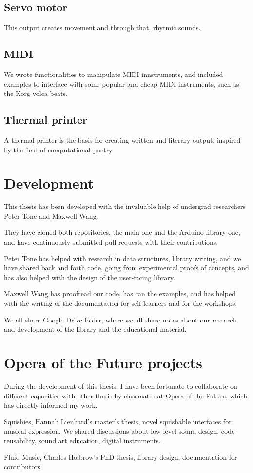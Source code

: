 \subsection{Servo motor}

This output creates movement and through that, rhytmic sounds.

\subsection{MIDI}

We wrote functionalities to manipulate MIDI innstruments, and included examples to interface with some popular and cheap MIDI instruments, such as the Korg volca beats.

\subsection{Thermal printer}

A thermal printer is the basis for creating written and literary output, inspired by the field of computational poetry.

\section{Development}

This thesis has been developed with the invaluable help of undergrad researchers Peter Tone and Maxwell Wang.

They have cloned both repositories, the main one and the Arduino library one, and have continuously submitted pull requests with their contributions.

Peter Tone has helped with research in data structures, library writing, and we have shared back and forth code, going from experimental proofs of concepts, and has also helped with the design of the user-facing library.

Maxwell Wang has proofread our code, has ran the examples, and has helped with the writing of the documentation for self-learners and for the workshops.

We all share Google Drive folder, where we all share notes about our research and development of the library and the educational material.

\section{Opera of the Future projects}

During the development of this thesis, I have been fortunate to collaborate on different capacities with other thesis by classmates at Opera of the Future, which has directly informed my work.

Squishies, Hannah Lienhard's master's thesis, novel squishable interfaces for musical expression. We shared discussions about low-level sound design, code reusability, sound art education, digital instruments.

Fluid Music, Charles Holbrow's PhD thesis, library design, documentation for contributors.
